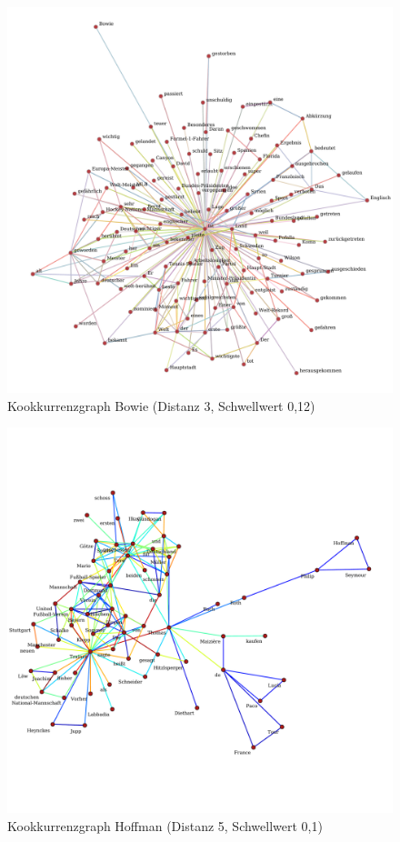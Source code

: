\documentclass[11pt, a4paper]{article}
\begin{document}
\begin{figure}[hp!]
    \centering
        \includegraphics[scale=.4]{../../data/results/longpath_wordgraphs/nl/graph_Bowie.pdf}
    \caption{Kookkurrenzgraph Bowie (Distanz 3, Schwellwert 0,12)}
    \label{fig:lp-bowie}
\end{figure}

\begin{figure}[hp!]
    \centering
        \includegraphics[scale=.4]{../../data/results/longpath_wordgraphs/nl/graph_Hoffman.pdf}
    \caption{Kookkurrenzgraph Hoffman (Distanz 5, Schwellwert 0,1)}
    \label{fig:lp-hoffman}
\end{figure}
\end{document}
